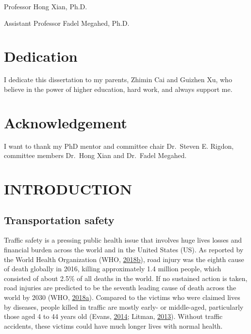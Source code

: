 \documentclass[12pt]{book}
\numberwithin{equation}{chapter}
\begin{document}
\vspace{.3cm}
Professor Hong Xian, Ph.D.

\vspace{.3cm}
Assistant Professor Fadel Megahed, Ph.D.
\vspace*{\fill}








\hypertarget{dedication}{%
\chapter*{Dedication}\label{dedication}}

I dedicate this dissertation to my parents, Zhimin Cai and Guizhen Xu, who believe in the power of higher education, hard work, and always support me.

\hypertarget{acknowledgement}{%
\chapter*{Acknowledgement}\label{acknowledgement}}

I want to thank my PhD mentor and committee chair Dr.~Steven E. Rigdon, committee members Dr.~Hong Xian and Dr.~Fadel Megahed.

\cleardoublepage
\tableofcontents

\listoffigures
\listoftables

\mainmatter
\doublespacing

\hypertarget{introduction}{%
\chapter{INTRODUCTION}\label{introduction}}

\hypertarget{transportation-safety}{%
\section{Transportation safety}\label{transportation-safety}}

Traffic safety is a pressing public health issue that involves huge lives losses and financial burden across the world and in the United States (US).
As reported by the World Health Organization (WHO, \protect\hyperlink{ref-who2018}{2018}\protect\hyperlink{ref-who2018}{b}), road injury was the eighth cause of death globally in 2016, killing approximately 1.4 million people, which consisted of about 2.5\% of all deaths in the world.
If no sustained action is taken, road injuries are predicted to be the seventh leading cause of death across the world by 2030 (WHO, \protect\hyperlink{ref-who2018b}{2018}\protect\hyperlink{ref-who2018b}{a}).
Compared to the victims who were claimed lives by diseases, people killed in traffic are mostly early- or middle-aged, particularly those aged 4 to 44 years old (Evans, \protect\hyperlink{ref-evans2014traffic}{2014}; Litman, \protect\hyperlink{ref-litman2013transportation}{2013}).
Without traffic accidents, these victims could have much longer lives with normal health.
\end{document}
